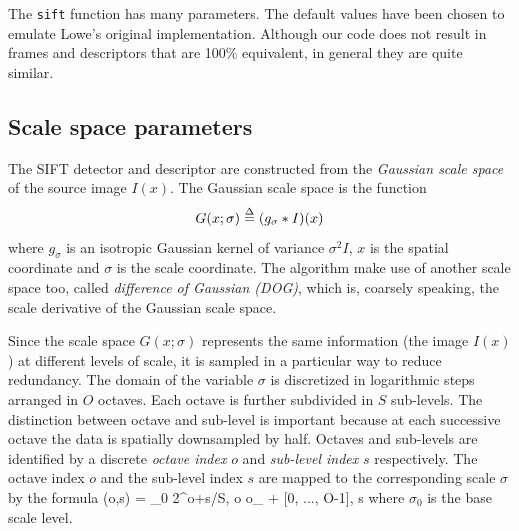 \documentclass{article}
\let\oldtt=\tt
\renewcommand{\tt}{\oldtt\color{codecolor}}
\begin{document}
The {\tt sift} function has many parameters. The default values have been chosen to emulate Lowe's original implementation. Although our code does not result in frames and descriptors that are 100\% equivalent, in general they are quite similar.

\subsection{Scale space parameters}\label{sift.user.ss}

The SIFT detector and descriptor are constructed from the {\em Gaussian scale space} of the source image $I(x)$. The Gaussian scale space is the function
\[
   G(x;\sigma) \overset{\Delta}{=} (g_\sigma*I)(x)
\]
where $g_\sigma$ is an isotropic Gaussian kernel of variance $\sigma^2 I$, $x$ is the spatial coordinate and $\sigma$ is the scale coordinate. The algorithm make use of another scale space too, called {\em difference of Gaussian (DOG)}, which is, coarsely speaking, the scale derivative of the Gaussian scale space. 

Since the scale space $G(x;\sigma)$ represents the same information (the image $I(x)$) at different levels of scale, it is sampled in a particular way to reduce redundancy. The domain of the variable $\sigma$ is discretized in logarithmic steps arranged in $O$ octaves. Each octave is further subdivided in $S$ sub-levels. The distinction between octave and sub-level is important because at each successive octave the data is spatially downsampled by half. Octaves and sub-levels are identified by a discrete {\em octave index} $o$ and {\em sub-level index} $s$ respectively. The octave index $o$ and the sub-level index $s$  are mapped to the corresponding scale $\sigma$ by the formula
\be\label{eq:scale}
  \sigma(o,s) = \sigma_0 2^{o+s/S},
  \quad o \in o_{\min} + [0, ..., O-1],
  \quad s \in [0,...,S-1]
\ee
where $\sigma_0$ is the base scale level.
\end{document}
